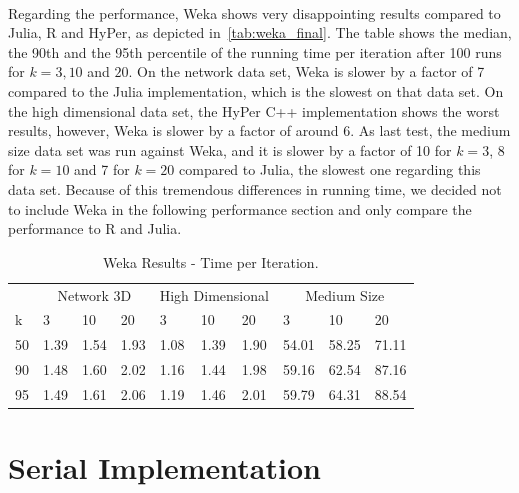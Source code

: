 \\
Regarding the performance, Weka shows very disappointing results compared to Julia, R and HyPer, as depicted in~\autoref{tab:weka_final}. The table shows the median, the 90th and the 95th percentile of the running time per iteration after 100 runs for $k = 3, 10$ and $20$. On the network data set, Weka is slower by a factor of 7 compared to the Julia implementation, which is the slowest on that data set. On the high dimensional data set, the HyPer C++ implementation shows the worst results, however, Weka is slower by a factor of around 6. As last test, the medium size data set was run against Weka, and it is slower by a factor of 10 for $k = 3$, 8 for $k = 10$ and 7 for $k = 20$ compared to Julia, the slowest one regarding this data set. Because of this tremendous differences in running time, we decided not to include Weka in the following performance section and only compare the performance to R and Julia.

\begin{table}[htsb]
  \caption[Weka Results - Time per Iteration]{Weka Results - Time per Iteration.}
  \label{tab:weka_final}
  \centering
  \begin{tabular}{l l l l l l l l l l }
    \toprule
      & \multicolumn{3}{c}{Network 3D} & \multicolumn{3}{c}{High Dimensional} & \multicolumn{3}{c}{Medium Size}  \\
      k & 3 & 10 & 20 & 3 & 10 & 20 & 3 & 10 & 20 \\
    \midrule
      50  & 1.39 & 1.54 & 1.93 & 1.08 & 1.39 & 1.90 & 54.01 & 58.25 & 71.11 \\
      90  & 1.48 & 1.60 & 2.02 & 1.16 & 1.44 & 1.98 &59.16 & 62.54 & 87.16 \\
      95  & 1.49 & 1.61 & 2.06 & 1.19 & 1.46 & 2.01 & 59.79 & 64.31 & 88.54 \\
    \bottomrule
  \end{tabular}
\end{table}



\section{Serial Implementation}\label{section:serial}

